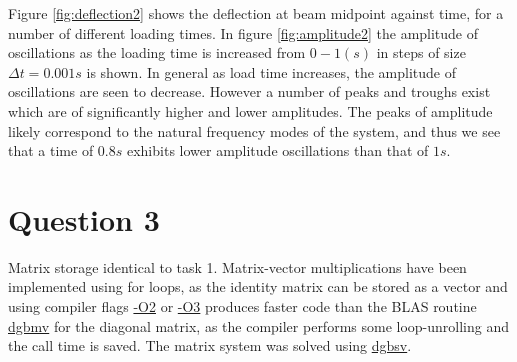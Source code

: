 \documentclass[10pt, a4paper]{article}
\begin{document}
\noindent
Figure \ref{fig:deflection2} shows the deflection at beam midpoint against time, for a number of different loading times. In figure \ref{fig:amplitude2} the amplitude of oscillations as the loading time is increased from $0 - 1 (s)$ in steps of size $\Delta t = 0.001 s$ is shown. In general as load time increases, the amplitude of oscillations are seen to decrease. However a number of peaks and troughs exist which are of significantly higher and lower amplitudes. The peaks of amplitude likely correspond to the natural frequency modes of the system, and thus we see that a time of $0.8s$ exhibits lower amplitude oscillations than that of $1s$.
\section*{Question 3}
Matrix storage identical to task 1. Matrix-vector multiplications have been implemented using for loops, as the identity matrix can be stored as a vector and using compiler flags \url{-O2} or \url{-O3} produces faster code than the BLAS routine \url{dgbmv} for the diagonal matrix, as the compiler performs some loop-unrolling and the call time is saved. The matrix system was solved using \url{dgbsv}.
\end{document}
